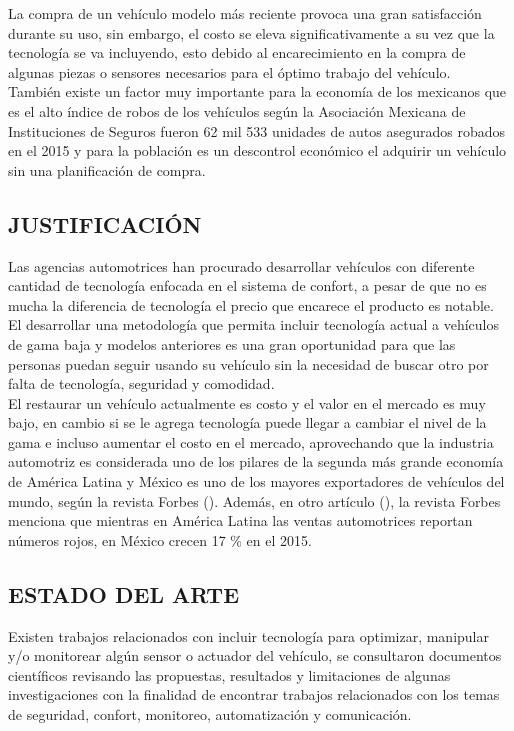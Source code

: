 La compra de un vehículo modelo más reciente provoca una gran satisfacción durante su uso, sin embargo, el costo se eleva significativamente a su vez que la tecnología se va incluyendo, esto debido al encarecimiento en la compra de algunas piezas o sensores necesarios para el óptimo trabajo del vehículo. \\

También existe un factor muy importante para la economía de los mexicanos que es el alto índice de robos de los vehículos según la Asociación Mexicana de Instituciones de Seguros \cite{UPS-19} fueron 62 mil 533 unidades de autos asegurados robados en el 2015 y para la población es un descontrol económico el adquirir un vehículo sin una planificación de compra.\\



\subsection{JUSTIFICACIÓN}
Las agencias automotrices han procurado desarrollar vehículos con diferente cantidad de tecnología enfocada en el sistema de confort, a pesar de que no es mucha la diferencia de tecnología el precio que encarece el producto es notable.\\

El desarrollar una metodología que permita incluir tecnología actual a vehículos de gama baja y modelos anteriores es una gran oportunidad para que las personas puedan seguir usando su vehículo sin la necesidad de buscar otro por falta de tecnología, seguridad y comodidad.  \\

El restaurar un vehículo actualmente es costo y el valor en el mercado es muy bajo, en cambio si se le agrega tecnología puede llegar a cambiar el nivel de la gama e incluso aumentar el costo en el mercado, aprovechando que la industria automotriz es considerada uno de los pilares de la segunda más grande economía de América Latina y México es uno de los mayores exportadores de vehículos del mundo, según la revista Forbes (\cite{UPS-20}). Además, en otro artículo (\cite{UPS-21}), la revista Forbes menciona que mientras en América Latina las ventas automotrices reportan números rojos, en México crecen 17 \% en el 2015. \\

\subsection{ESTADO DEL ARTE}
Existen trabajos relacionados con incluir tecnología para optimizar, manipular y/o monitorear algún sensor o actuador del vehículo, se consultaron documentos científicos revisando las propuestas, resultados y limitaciones de algunas investigaciones con la finalidad de encontrar trabajos relacionados con los temas de seguridad, confort, monitoreo, automatización y comunicación.\\

